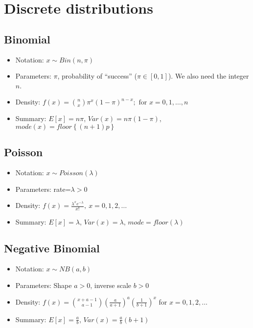 \documentclass{article}
\begin{document}
\section{Discrete distributions}


\subsection{Binomial}

\begin{itemize}
\item[] Notation: $x \sim Bin(n, \pi)$

\item[] Parameters: $\pi$, probability of ``success'' ($\pi \in [0,1]$).   We also need the integer $n$.

\item[] Density: $f(x) = \binom{n}{x} \pi^x(1-\pi)^{n-x}; \mbox{ for } x=0,1,\ldots,n$

\item[] Summary: $E[x]=n\pi$, $Var(x)=n\pi(1-\pi)$, $mode(x)=floor\left\{(n+1)p\right\}$
\end{itemize}


\subsection{Poisson}

\begin{itemize}
\item[] Notation: $x \sim Poisson(\lambda)$

\item[] Parameters: rate=$\lambda>0$

\item[] Density: $f(x)=\frac{\lambda^xe^{-\lambda}}{x!},\ x=0,1,2,\ldots$

\item[] Summary: $E[x]=\lambda$, $Var(x)=\lambda$, $mode=floor(\lambda)$
\end{itemize}


\subsection{Negative Binomial}

\begin{itemize}

\item[] Notation: $x \sim NB(a,b)$

\item[] Parameters: Shape $a>0$, inverse scale $b>0$

\item[] Density: $f(x)= \binom{x+a-1}{a-1}  \left( \frac{a}{a+1} \right)^a \left( \frac{1}{b+1} \right)^x$ for $x=0, 1, 2, \ldots$

\item[] Summary: $E[x]=\frac{a}{b}$, $Var(x)=\frac{a}{b}(b+1)$

\end{itemize}
\end{document}
